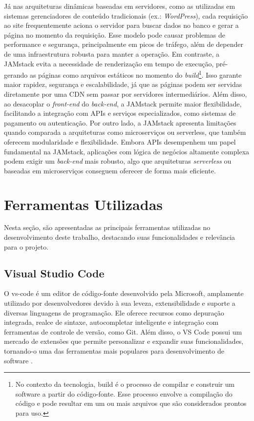 {Já nas arquiteturas dinâmicas baseadas em servidores, como as utilizadas em sistemas gerenciadores de conteúdo tradicionais (ex.: \textit{WordPress}), cada requisição ao site frequentemente aciona o servidor para buscar dados no banco e gerar a página no momento da requisição. Esse modelo pode causar problemas de performance e segurança, principalmente em picos de tráfego, além de depender de uma infraestrutura robusta para manter a operação.
Em contraste, a JAMstack evita a necessidade de renderização em tempo de execução, pré-gerando as páginas como arquivos estáticos no momento do \textit{build}\footnote{No contexto da tecnologia, build é o processo de compilar e construir um software a partir do código-fonte. Esse processo envolve a compilação do código e pode resultar em um ou mais arquivos que são considerados prontos para uso.}. Isso garante maior rapidez, segurança e escalabilidade, já que as páginas podem ser servidas diretamente por uma CDN sem passar por servidores intermediários. Além disso, ao desacoplar o \textit{front-end} do \textit{back-end}, a JAMstack permite maior flexibilidade, facilitando a integração com APIs e serviços especializados, como sistemas de pagamento ou autenticação.
Por outro lado, a JAMstack apresenta limitações quando comparada a arquiteturas como microserviços ou serverless, que também oferecem modularidade e flexibilidade. Embora APIs desempenhem um papel fundamental na JAMstack, aplicações com lógica de negócios altamente complexa podem exigir um \textit{back-end} mais robusto, algo que arquiteturas \textit{serverless} ou baseadas em microserviços conseguem oferecer de forma mais eficiente.

\section{Ferramentas Utilizadas}
Nesta seção, são apresentadas as principais ferramentas utilizadas no desenvolvimento deste trabalho, destacando suas funcionalidades e relevância para o projeto.

\subsection{Visual Studio Code}
O \gls{vs-code} é um editor de código-fonte desenvolvido pela Microsoft, amplamente utilizado por desenvolvedores devido à sua leveza, extensibilidade e suporte a diversas linguagens de programação. Ele oferece recursos como depuração integrada, realce de sintaxe, autocompletar inteligente e integração com ferramentas de controle de versão, como Git. Além disso, o VS Code possui um mercado de extensões que permite personalizar e expandir suas funcionalidades, tornando-o uma das ferramentas mais populares para desenvolvimento de software \citep{vscode}.

}
